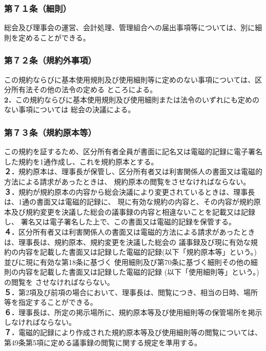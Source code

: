 \documentclass[
  luatex,
  paper=a4paper,
  fontsize=11pt,
  jafontsize=10pt,
  jlreq_notes,
]{jlreq}
\begin{document}
  \subsubsection*{第７１条（細則）}
  総会及び理事会の運営、会計処理、管理組合への届出事項等については、別に細則を定めることができる。
  \subsubsection*{第７２条（規約外事項）}
  この規約ならびに基本使用規則及び使用細則等に定めのない事項については、区分所有法その他の法令の定める
  ところによる。\\
  \textbf{2．}この規約ならびに基本使用規則及び使用細則または法令のいずれにも定めのない事項については
  総会の決議による。
  \subsubsection*{第７３条（規約原本等）}
  この規約を証するため、区分所有者全員が書面に記名又は電磁的記録に電子署名した規約を1通作成し、これを規約原本とする。\\
  \textbf{２．}規約原本は、理事長が保管し、区分所有者又は利害関係人の書面又は電磁的方法による請求があったときは、
  規約原本の閲覧をさせなければならない。\\
  \textbf{３．}規約が規約原本の内容から総会決議により変更されているときは、理事長は、1通の書面又は電磁的記録に、
  現に有効な規約の内容と、その内容が規約原本及び規約変更を決議した総会の議事録の内容と相違ないことを記載又は記録し、
  署名又は電子署名した上で、この書面又は電磁的記録を保管する。\\
  \textbf{４．}区分所有者又は利害関係人の書面又は電磁的方法による請求があったときは、理事長は、規約原本、規約変更を決議した総会の
  議事録及び現に有効な規約の内容を記載した書面又は記録した電磁的記録(以下「規約原本等」という。)並びに現に有効な第18条に基づく
  使用細則及び第70条に基づく細則その他の細則の内容を記載した書面又は記録した電磁的記録 (以下「使用細則等」という。)の閲覧を
  させなければならない。\\
  \textbf{５．}第2項及び前項の場合において、理事長は、閲覧につき、相当の日時、場所等を指定することができる。\\
  \textbf{６．}理事長は、所定の掲示場所に、規約原本等及び使用細則等の保管場所を掲示しなければならない。\\
  \textbf{７．}電磁的記録により作成された規約原本等及び使用細則等の閲覧については、第49条第5項に定める議事録の閲覧に関する規定を準用する。\\
  
\end{document}

